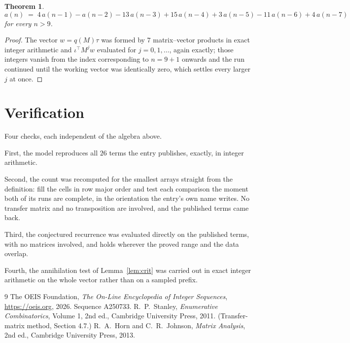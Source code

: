 \documentclass[11pt,a4paper]{article}
\theoremstyle{plain}
\newtheorem{theorem}{Theorem}
\theoremstyle{definition}
\begin{document}
\begin{theorem}
\[
a(n)\;=\;4\,a(n-1) - a(n-2) - 13\,a(n-3) + 15\,a(n-4) + 3\,a(n-5) - 11\,a(n-6) + 4\,a(n-7)
\]
for every $n>9$.
\end{theorem}

\begin{proof}
The vector $w=q(M)\tau$ was formed by $7$ matrix--vector products in exact integer
arithmetic and $\iota^{\!\top}M^{j}w$ evaluated for $j=0,1,\dots$, again exactly; those
integers vanish from the index corresponding to $n=9+1$ onwards and the run continued
until the working vector was identically zero, which settles every larger $j$ at once.
\end{proof}

\section{Verification}

Four checks, each independent of the algebra above.

First, the model reproduces all $26$ terms the entry publishes, exactly, in integer
arithmetic.

Second, the count was recomputed for the smallest arrays straight from the definition: fill the
cells in row major order and test each comparison the moment both of its runs are complete,
in the orientation the entry's own name writes. No transfer matrix and no transposition are
involved, and the published terms came back.

Third, the conjectured recurrence was evaluated directly on the published terms, with no
matrices involved, and holds wherever the proved range and the data overlap.

Fourth, the annihilation test of Lemma~\ref{lem:crit} was carried out in exact integer
arithmetic on the whole vector rather than on a sampled prefix.

\begin{thebibliography}{9}
 The OEIS Foundation, \emph{The On-Line Encyclopedia of Integer
Sequences}, \url{https://oeis.org}, 2026. Sequence A250733.
 R.~P.~Stanley, \emph{Enumerative Combinatorics}, Volume 1, 2nd ed.,
Cambridge University Press, 2011. (Transfer-matrix method, Section 4.7.)
 R.~A.~Horn and C.~R.~Johnson, \emph{Matrix Analysis}, 2nd ed., Cambridge
University Press, 2013.
\end{thebibliography}
\end{document}
